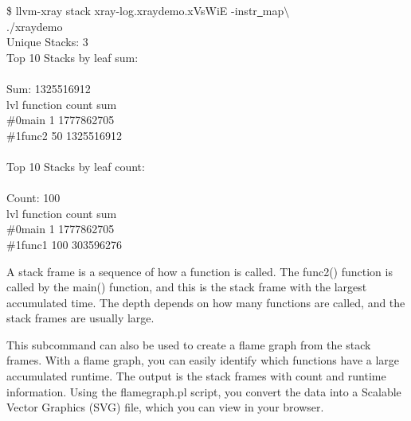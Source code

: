 \begin{tcolorbox}[colback=white,colframe=black]
\$ llvm-xray stack xray-log.xraydemo.xVsWiE -instr\underline{~}map$\setminus$ \\
\hspace*{0.5cm}./xraydemo \\
Unique Stacks: 3 \\
Top 10 Stacks by leaf sum:\\
\\
Sum: 1325516912\\
lvl \hspace{1cm}function \hspace{2.5cm}count \hspace{2.5cm}sum\\
\#0\hspace{1.5cm}main \hspace{3.3cm}1 \hspace{1.3cm}1777862705 \\
\#1\hspace{1.5cm}func2 \hspace{3.0cm}50 \hspace{1.35cm}1325516912 \\
\\
Top 10 Stacks by leaf count:\\
\\
Count: 100 \\
lvl \hspace{1cm}function \hspace{2.5cm}count \hspace{2.5cm}sum \\
\#0\hspace{1.5cm}main \hspace{3.3cm}1 \hspace{1.3cm}1777862705 \\
\#1\hspace{1.5cm}func1 \hspace{2.9cm}100 \hspace{1.45cm}303596276
\end{tcolorbox}

A stack frame is a sequence of how a function is called. The func2() function is called by the main() function, and this is the stack frame with the largest accumulated time. The depth depends on how many functions are called, and the stack frames are usually large.\par

This subcommand can also be used to create a flame graph from the stack frames. With a flame graph, you can easily identify which functions have a large accumulated runtime. The output is the stack frames with count and runtime information. Using the flamegraph.pl script, you convert the data into a Scalable Vector Graphics (SVG) file, which you can view in your browser.\par

